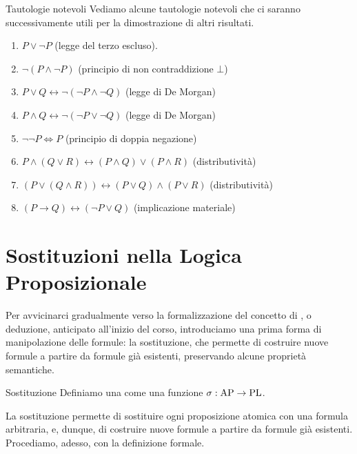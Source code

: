 \begin{example}[namedlabel={ex:notable_tautologies}{Tautologie notevoli}]{Tautologie notevoli}
  Vediamo alcune tautologie notevoli che ci saranno successivamente utili per la dimostrazione di altri risultati.
  \begin{enumerate}
    \item \(P \lor \neg P\) (legge del terzo escluso).
    \item \(\neg (P \land \neg P)\) (principio di non contraddizione \(\bot\))
    \item \(P \lor Q \leftrightarrow \neg(\neg P \land \neg Q)\) (legge di De Morgan)
    \item \(P\land Q \leftrightarrow \neg(\neg P \lor \neg Q)\) (legge di De Morgan)
    \item \(\neg \neg P \iff P\) (principio di doppia negazione)
    \item \(P \land(Q \lor R) \leftrightarrow (P \land Q) \lor (P \land R)\) (distributività)
    \item \((P \lor(Q\land R)) \leftrightarrow (P \lor Q) \land (P \lor R)\) (distributività)
    \item \((P \rightarrow Q) \leftrightarrow (\neg P \lor Q)\) (implicazione materiale)
  \end{enumerate}
\end{example}

\section{Sostituzioni nella Logica Proposizionale}

Per avvicinarci gradualmente verso la formalizzazione del concetto di , o deduzione, anticipato all'inizio del corso, introduciamo una prima forma di manipolazione delle formule: la sostituzione, che permette di costruire nuove formule a partire da formule già esistenti, preservando alcune proprietà semantiche.

\begin{definition}{Sostituzione}
  Definiamo una  come una funzione \(\sigma: \AP \to \PL\).
\end{definition}

La sostituzione permette di sostituire ogni proposizione atomica con una formula arbitraria, e, dunque, di costruire nuove formule a partire da formule già esistenti. Procediamo, adesso, con la definizione formale.

